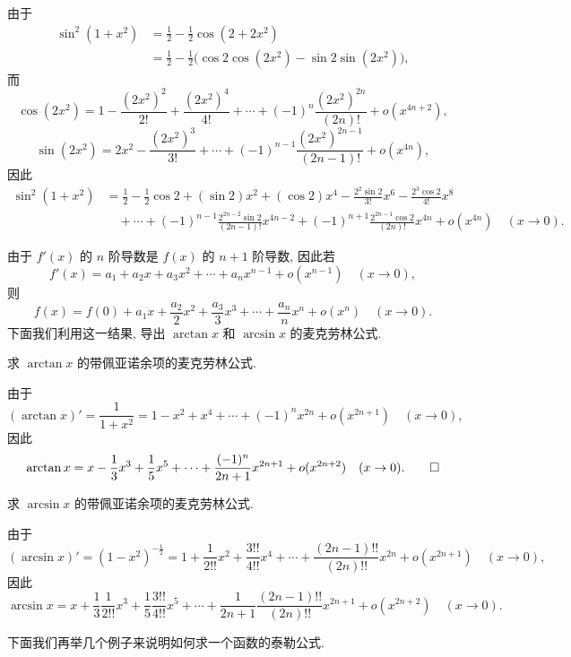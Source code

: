 \begin{solve}
由于
\[
\begin{aligned}
  \sin^2(1+x^2)
  &=
  \frac12-\frac12\cos(2+2x^2) \\
  &=
  \frac12-\frac12\bigl(\cos2\cos(2x^2)-\sin2\sin(2x^2)\bigr),
\end{aligned}
\]
而
\[
  \cos(2x^2)=1-\frac{(2x^2)^2}{2!}+\frac{(2x^2)^4}{4!}+\cdots+(-1)^n\frac{(2x^2)^{2n}}{(2n)!}+o(x^{4n+2}),
\]
\[
  \sin(2x^2)=2x^2-\frac{(2x^2)^3}{3!}+\cdots+(-1)^{n-1}\frac{(2x^2)^{2n-1}}{(2n-1)!}+o(x^{4n}),
\]
因此
\[
\begin{aligned}
  \sin^2(1+x^2)
  &=
  \frac12-\frac12\cos2+(\sin2)x^2+(\cos2)x^4-\frac{2^2\sin2}{3!}x^6
  -\frac{2^3\cos2}{4!}x^8 \\
  &\quad+\cdots+(-1)^{n-1}\frac{2^{2n-2}\sin2}{(2n-1)!}x^{4n-2}
  +(-1)^{n+1}\frac{2^{2n-1}\cos2}{(2n)!}x^{4n}
  +o(x^{4n})
  \quad (x\to0).
\end{aligned}
\]

由于 $f'(x)$ 的 $n$ 阶导数是 $f(x)$ 的 $n+1$ 阶导数, 因此若
\[
  f'(x)=a_1+a_2x+a_3x^2+\cdots+a_nx^{n-1}+o(x^{n-1})\quad (x\to0),
\]
则
\[
  f(x)=f(0)+a_1x+\frac{a_2}{2}x^2+\frac{a_3}{3}x^3+\cdots+\frac{a_n}{n}x^n+o(x^n)\quad (x\to0).
\]
下面我们利用这一结果, 导出 $\arctan x$ 和 $\arcsin x$ 的麦克劳林公式.
\end{solve}


\begin{example}\label{example:ma-5-3-7}
求 $\arctan x$ 的带佩亚诺余项的麦克劳林公式.
\end{example}


\begin{solve}
由于
\[
  (\arctan x)'=\frac1{1+x^2}=1-x^2+x^4+\cdots+(-1)^nx^{2n}+o(x^{2n+1})\quad (x\to0),
\]
因此
\[
  \arctan x=x-\frac13x^3+\frac15x^5+\cdots+\frac{(-1)^n}{2n+1}x^{2n+1}+o(x^{2n+2})\quad (x\to0).
\qedhere
\]
\end{solve}


\begin{example}\label{example:ma-5-3-8}
求 $\arcsin x$ 的带佩亚诺余项的麦克劳林公式.
\end{example}


\begin{solve}
由于
\[
  (\arcsin x)'=(1-x^2)^{-\frac12}
  =
  1+\frac1{2!!}x^2+\frac{3!!}{4!!}x^4+\cdots+
  \frac{(2n-1)!!}{(2n)!!}x^{2n}+o(x^{2n+1})
  \quad (x\to0),
\]
因此
\[
  \arcsin x
  =
  x+\frac13\frac1{2!!}x^3+\frac15\frac{3!!}{4!!}x^5+\cdots
  +\frac1{2n+1}\frac{(2n-1)!!}{(2n)!!}x^{2n+1}
  +o(x^{2n+2})
  \quad (x\to0).
\]

下面我们再举几个例子来说明如何求一个函数的泰勒公式.
\end{solve}


